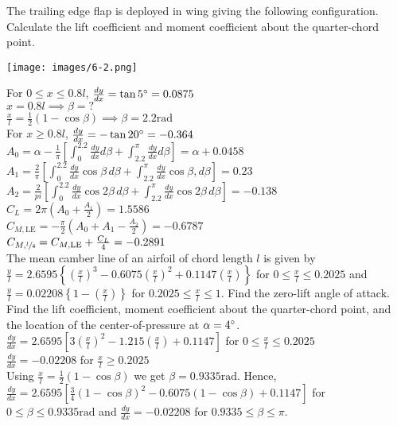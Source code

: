\documentclass[12pt, twocolumn, letterpaper]{article}
\begin{document}
The trailing edge flap is deployed in wing giving the following configuration. Calculate the lift coefficient and moment coefficient about the quarter-chord point.\\
\begin{center}
    \texttt{[image: images/6-2.png]}
\end{center}
For $0\leq x\leq0.8l$, $\frac{dy}{dx}=\tan 5\degree=0.0875$\\
$x=0.8l\implies \beta=?$\\
$\frac{x}{l}=\frac{1}{2}(1-\cos\beta)\implies\beta=2.2 \text{rad}$\\
For $x\geq0.8l$, $\frac{dy}{dx}=-\tan20\degree=-0.364$\\
$A_0=\alpha-\frac{1}{\pi}\left[\int_0^{2.2}\frac{dy}{dx}d\beta+\int_{2.2}^\pi\frac{dy}{dx}d\beta\right]=\alpha+0.0458$\\
$A_1=\frac{2}{\pi}\left[\int_0^{2.2}\frac{dy}{dx}\cos\beta\,d\beta+\int_{2.2}^\pi\frac{dy}{dx}\cos\beta,d\beta\right]=0.23$\\
$A_2=\frac{2}{pi}\left[\int_0^{2.2}\frac{dy}{dx}\cos2\beta\,d\beta+\int_{2.2}^\pi\frac{dy}{dx}\cos2\beta\,d\beta\right]=-0.138$\\
$C_L=2\pi\left(A_0+\frac{A_1}{2}\right)=1.5586$\\
$C_{M,\text{LE}}=-\frac{\pi}{2}\left(A_0+A_1-\frac{A_2}{2}\right)=-0.6787$\\
$C_{M,\sfrac{l}{4}}=C_{M,\text{LE}}+\frac{C_L}{4}=-0.2891$\\
\hline
The mean camber line of an airfoil of chord length $l$ is given by $\frac{y}{l}=2.6595\left\{\left(\frac{x}{l}\right)^3-0.6075\left(\frac{x}{l}\right)^2+0.1147\left(\frac{x}{l}\right)\right\}$ for $0\leq\frac{x}{l}\leq0.2025$ and $\frac{y}{l}=0.02208\left\{1-\left(\frac{x}{l}\right)\right\}$ for $0.2025\leq\frac{x}{l}\leq1$. Find the zero-lift angle of attack. Find the lift coefficient, moment coefficient about the quarter-chord point, and the location of the center-of-pressure at $\alpha=4\degree$.\\
$\frac{dy}{dx}=2.6595\left[3\left(\frac{x}{l}\right)^2-1.215\left(\frac{x}{l}\right)+0.1147\right]$ for $0\leq\frac{x}{l}\leq0.2025$\\
$\frac{dy}{dx}=-0.02208$ for $\frac{x}{l}\geq0.2025$\\
Using $\frac{x}{l}=\frac{1}{2}(1-\cos\beta)$ we get $\beta=0.9335\text{rad}$.
Hence, $\frac{dy}{dx}=2.6595\left[\frac{3}{4}(1-\cos\beta)^2-0.6075(1-\cos\beta)+0.1147\right]$ for $0\leq\beta\leq0.9335\text{rad}$ and $\frac{dy}{dx}=-0.02208$ for $0.9335\leq\beta\leq\pi$.\\
\end{document}
